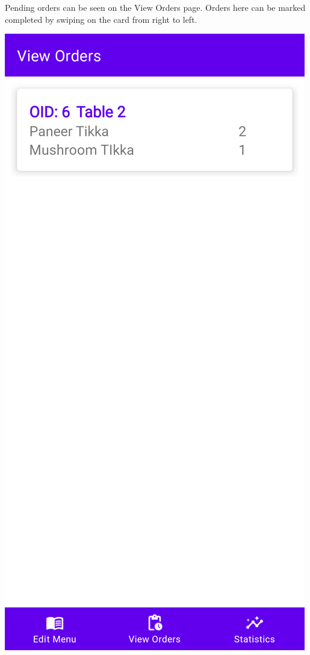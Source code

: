 \documentclass{article}
\begin{document}
\newpage
Pending orders can be seen on the View Orders page. Orders here can be marked completed by swiping on the card from right to left.
\begin{center}
\includegraphics[scale=0.15]{view-orders}

\end{center}
\end{document}
